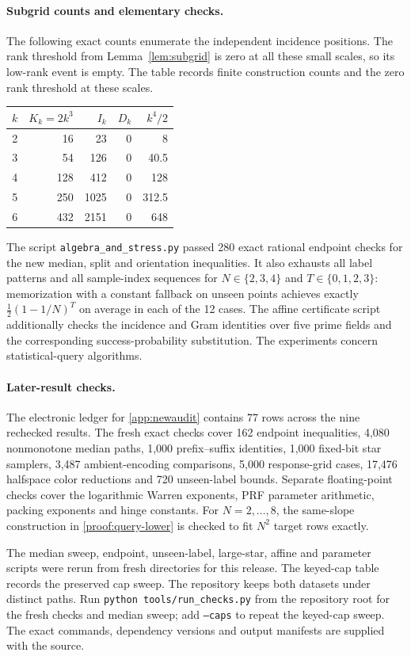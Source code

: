\paragraph{Subgrid counts and elementary checks.}
The following exact counts enumerate the independent incidence positions. The rank threshold from Lemma~\ref{lem:subgrid} is zero at all these small scales, so its low-rank event is empty. The table records finite construction counts and the zero rank threshold at these scales.
\begin{center}
\begin{tabular}{rrrrr}
\toprule
$k$&$K_k=2k^3$&$I_k$&$D_k$&$k^4/2$\\
\midrule
2&16&23&0&8\\
3&54&126&0&40.5\\
4&128&412&0&128\\
5&250&1025&0&312.5\\
6&432&2151&0&648\\
\bottomrule
\end{tabular}
\end{center}
The script \texttt{algebra\_and\_stress.py} passed 280 exact rational endpoint checks for the new median, split and orientation inequalities. It also exhausts all label patterns and all sample-index sequences for $N\in\{2,3,4\}$ and $T\in\{0,1,2,3\}$: memorization with a constant fallback on unseen points achieves exactly $\tfrac12(1-1/N)^T$ on average in each of the 12 cases. The affine certificate script additionally checks the incidence and Gram identities over five prime fields and the corresponding success-probability substitution. The experiments concern statistical-query algorithms.


\paragraph{Later-result checks.}
The electronic ledger for \cref{app:newaudit} contains 77 rows across the nine rechecked results. The fresh exact checks cover 162 endpoint inequalities, 4,080 nonmonotone median paths, 1,000 prefix--suffix identities, 1,000 fixed-bit star samplers, 3,487 ambient-encoding comparisons, 5,000 response-grid cases, 17,476 halfspace color reductions and 720 unseen-label bounds. Separate floating-point checks cover the logarithmic Warren exponents, PRF parameter arithmetic, packing exponents and hinge constants. For $N=2,\ldots,8$, the same-slope construction in \cref{proof:query-lower} is checked to fit $N^2$ target rows exactly.

The median sweep, endpoint, unseen-label, large-star, affine and parameter scripts were rerun from fresh directories for this release. The keyed-cap table records the preserved cap sweep. The repository keeps both datasets under distinct paths. Run \texttt{python tools/run\_checks.py} from the repository root for the fresh checks and median sweep; add \texttt{--caps} to repeat the keyed-cap sweep. The exact commands, dependency versions and output manifests are supplied with the source.
